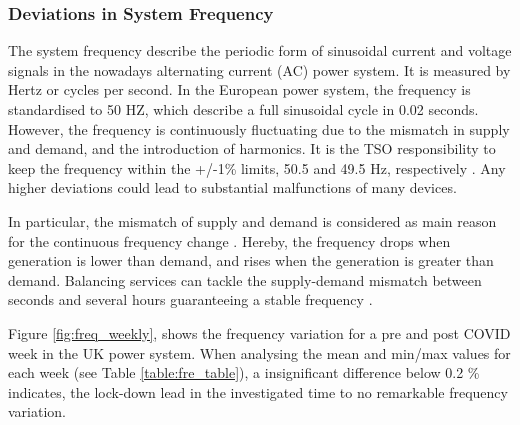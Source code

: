 \documentclass[energies,article,submit,moreauthors,pdftex]{Definitions/mdpi}
\begin{document}


\subsubsection{Deviations in  System Frequency}

The system frequency describe the periodic form of sinusoidal current and voltage signals in the nowadays alternating current (AC) power system. It is measured by Hertz or cycles per second. In the European power system, the frequency is standardised to 50 HZ, which describe a full sinusoidal cycle in 0.02 seconds. However, the frequency is continuously fluctuating due to the mismatch in supply and demand, and the introduction of harmonics. It is the TSO responsibility to keep the frequency within the +/-1\% limits, 50.5 and 49.5 Hz, respectively \cite{ELEXON2020ELEXONBMRS}. Any higher deviations could lead to substantial malfunctions of many devices.

In particular, the mismatch of supply and demand is considered as main reason for the continuous frequency change \cite{ELEXON2020ELEXONBMRS}. Hereby, the frequency drops when generation is lower than demand, and rises when the generation is greater than demand. Balancing services can tackle the supply-demand mismatch between seconds and several hours guaranteeing a stable frequency \cite{Nationalgrid2018BalancingStatement}. 

Figure \ref{fig:freq_weekly}, shows the frequency variation for a pre and post COVID week in the UK power system. When analysing the mean and min/max values for each week (see Table \ref{table:fre_table}), a insignificant difference below 0.2 \% indicates, the lock-down lead in the investigated time to no remarkable frequency variation.  

\end{document}
